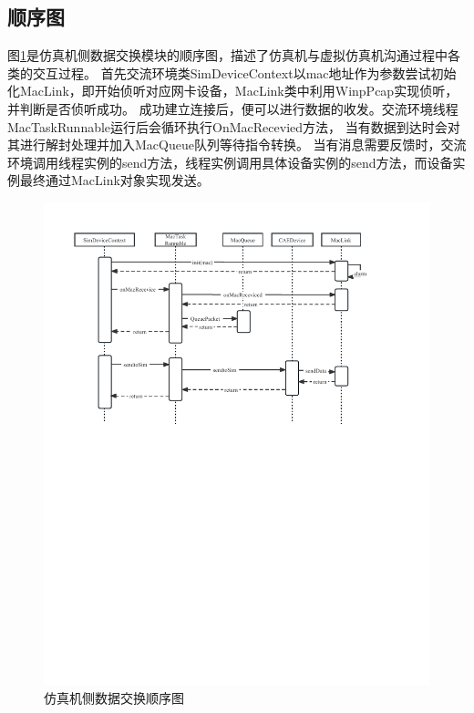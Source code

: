 \subsection{顺序图}
图\ref{seq1}是仿真机侧数据交换模块的顺序图，描述了仿真机与虚拟仿真机沟通过程中各类的交互过程。
首先交流环境类SimDeviceContext以mac地址作为参数尝试初始化MacLink，即开始侦听对应网卡设备，MacLink类中利用WinpPcap实现侦听，并判断是否侦听成功。
成功建立连接后，便可以进行数据的收发。交流环境线程MacTaskRunnable运行后会循环执行OnMacRecevied方法，
当有数据到达时会对其进行解封处理并加入MacQueue队列等待指令转换。
当有消息需要反馈时，交流环境调用线程实例的send方法，线程实例调用具体设备实例的send方法，而设备实例最终通过MacLink对象实现发送。
\begin{figure}[h!]
    \begin{center}
        \includegraphics[width=\textwidth]{pictures/sequence1.pdf}
        \caption{仿真机侧数据交换顺序图}
        \label{seq1}
    \end{center}
\end{figure}
